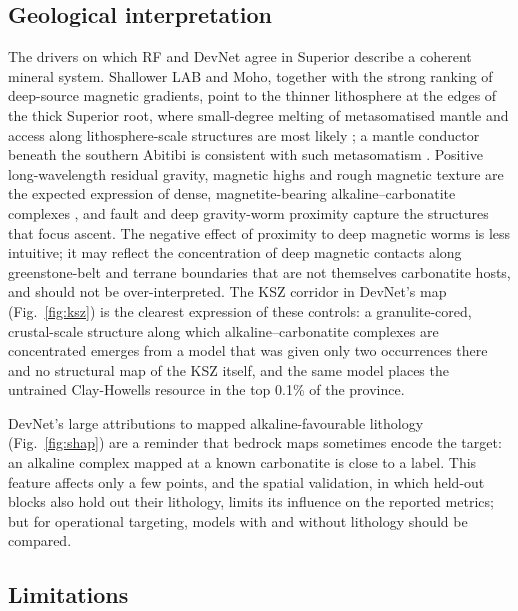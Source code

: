 \documentclass[pdflatex,sn-apa]{sn-jnl}
\begin{document}
\subsection{Geological interpretation}\label{sec:disc-geology}

The drivers on which RF and DevNet agree in Superior describe a coherent mineral system. Shallower LAB and Moho, together with the strong ranking of deep-source magnetic gradients, point to the thinner lithosphere at the edges of the thick Superior root, where small-degree melting of metasomatised mantle and access along lithosphere-scale structures are most likely \citep{Griffin2013,Groves2021,Hoggard2020}; a mantle conductor beneath the southern Abitibi is consistent with such metasomatism \citep{Snyder2021}. Positive long-wavelength residual gravity, magnetic highs and rough magnetic texture are the expected expression of dense, magnetite-bearing alkaline--carbonatite complexes \citep{Thomas2016}, and fault and deep gravity-worm proximity capture the structures that focus ascent. The negative effect of proximity to deep magnetic worms is less intuitive; it may reflect the concentration of deep magnetic contacts along greenstone-belt and terrane boundaries that are not themselves carbonatite hosts, and should not be over-interpreted. The KSZ corridor in DevNet's map (Fig.~\ref{fig:ksz}) is the clearest expression of these controls: a granulite-cored, crustal-scale structure along which alkaline--carbonatite complexes are concentrated \citep{Percival1994,Gittins1967} emerges from a model that was given only two occurrences there and no structural map of the KSZ itself, and the same model places the untrained Clay-Howells resource in the top 0.1\% of the province.

DevNet's large attributions to mapped alkaline-favourable lithology (Fig.~\ref{fig:shap}) are a reminder that bedrock maps sometimes encode the target: an alkaline complex mapped at a known carbonatite is close to a label. This feature affects only a few points, and the spatial validation, in which held-out blocks also hold out their lithology, limits its influence on the reported metrics; but for operational targeting, models with and without lithology should be compared.

\subsection{Limitations}\label{sec:limitations}
\end{document}
